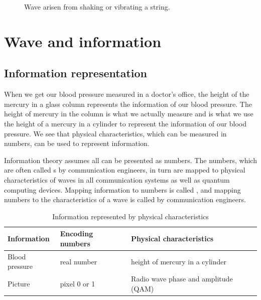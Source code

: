 \documentclass[Letter,11pt]{book}
\begin{document}
\begin{figure}[ht]\label{String}
\caption{Wave arisen from shaking or vibrating a string.}
\end{figure}

\section{Wave and information}
\subsection{Information representation}
When we get our blood pressure measured in a doctor's office, the height of the mercury in a glass column represents the information of our blood pressure. The height of mercury in the column is what we actually measure and is what we use the height of a mercury in a cylinder to represent the information of our blood pressure. We see that physical characteristics, which can be measured in numbers, can be used to represent information.

Information theory assumes all  can be presented as numbers. The numbers, which are often called s by communication engineers, in turn are mapped to physical characteristics of waves in all communication systems as well as quantum computing devices. Mapping information to numbers is called , and mapping numbers to the characteristics of a wave is called  by communication engineers.

\begin{table}[]
\label{information-characteristics}
\begin{tabular}{|l|l|l|}
\hline
Information & Encoding numbers & Physical characteristics  \\ \hline
Blood pressure & real number & height of mercury in a cylinder \\ \hline
Picture & pixel 0 or 1 & Radio wave phase and amplitude (QAM) \\ \hline
\end{tabular}
\caption{Information represented by physical characteristics}
\end{table}
\end{document}
